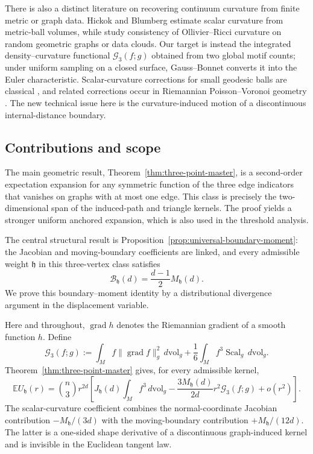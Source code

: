 \documentclass[11pt]{article}
\theoremstyle{remark}
\newcommand{\Scal}{\operatorname{Scal}}
\newcommand{\grad}{\operatorname{grad}}
\numberwithin{equation}{section}
\begin{document}
There is also a distinct literature on recovering continuum curvature from
finite metric or graph data.  Hickok and Blumberg \cite{HickokBlumberg2023}
estimate scalar curvature from metric-ball volumes, while
\cite{vanDerHoornEtAl2023,GarciaTrillosWeber2026} study consistency of
Ollivier--Ricci curvature on random geometric graphs or data clouds.
Our target is instead the integrated density--curvature functional
$\mathcal G_3(f;g)$ obtained from two global motif counts; under uniform
sampling on a closed surface, Gauss--Bonnet converts it into the Euler
characteristic.  Scalar-curvature corrections for small geodesic balls are
classical \cite{Gray1973}, and related corrections occur in Riemannian
Poisson--Voronoi geometry \cite{CalkaChapronEnriquez2021}.
The new technical issue here is the curvature-induced motion of a
discontinuous internal-distance boundary.

\subsection{Contributions and scope}
\label{subsec:contributions-scope}

The main geometric result, Theorem~\ref{thm:three-point-master}, is a
second-order expectation expansion for any symmetric function of the three
edge indicators that vanishes on graphs with at most one edge.  This class is
precisely the two-dimensional span of the induced-path and triangle kernels.
The proof yields a stronger uniform anchored expansion, which is also used in
the threshold analysis.

The central structural result is
Proposition~\ref{prop:universal-boundary-moment}: the Jacobian and
moving-boundary coefficients are linked, and every admissible weight
$\mathfrak h$ in this three-vertex class satisfies
\[
\mathcal B_{\mathfrak h}(d)=\frac{d-1}{2}M_{\mathfrak h}(d).
\]
We prove this boundary--moment identity by a distributional divergence
argument in the displacement variable.

Here and throughout, $\grad h$ denotes the Riemannian gradient of a smooth
function $h$.  Define
\[
\mathcal G_3(f;g):=
\int_M f\|\grad f\|_g^2\,d\mathrm{vol}_g
+\frac16\int_M f^3\Scal_g\,d\mathrm{vol}_g.
\]
Theorem~\ref{thm:three-point-master} gives, for every admissible kernel,
\[
\mathbb E U_{\mathfrak h}(r)
=\binom n3 r^{2d}\left[
J_{\mathfrak h}(d)\int_M f^3\,d\mathrm{vol}_g
-\frac{3M_{\mathfrak h}(d)}{2d}r^2\mathcal G_3(f;g)
+o(r^2)\right].
\]
The scalar-curvature coefficient combines the normal-coordinate Jacobian
contribution $-M_{\mathfrak h}/(3d)$ with the moving-boundary contribution
$+M_{\mathfrak h}/(12d)$.  The latter is a one-sided shape derivative of a
discontinuous graph-induced kernel and is invisible in the Euclidean tangent
law.
\end{document}
